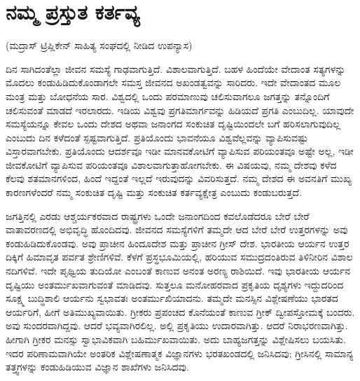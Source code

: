 
\chapter{ನಮ್ಮ ಪ್ರಸ್ತುತ ಕರ್ತವ್ಯ}

\begin{center}
(ಮದ್ರಾಸ್​ ಟ್ರಿಪ್ಲಿಕೇನ್​ ಸಾಹಿತ್ಯ ಸಂಘದಲ್ಲಿ ನೀಡಿದ ಉಪನ್ಯಾಸ)
\end{center}

ದಿನ ಸಾಗಿದಂತೆಲ್ಲಾ ಜೀವನ ಸಮಸ್ಯೆ ಗಾಢವಾಗುತ್ತಿದೆ. ವಿಶಾಲವಾಗುತ್ತಿದೆ. ಬಹಳ ಹಿಂದೆಯೇ ವೇದಾಂತ ಸತ್ಯಗಳನ್ನು ಮೊದಲು ಕಂಡುಹಿಡಿದುಕೊಂಡಾಗಲೇ ಸಮಸ್ತ ಜೀವನದ ಅಖಂಡತ್ವವನ್ನು ಸಾರಿದರು. ಇದೇ ವೇದಾಂತದ ಮೂಲ ಮಂತ್ರ ಮತ್ತು ಬೋಧನೆಯ ಸಾರ. ವಿಶ್ವದಲ್ಲಿ ಒಂದು ಪರಮಾಣುವು ಚಲಿಸುವಾಗಲೂ ಜಗತ್ತನ್ನು ತನ್ನೊಂದಿಗೆ ಚಲಿಸುವಂತೆ ಮಾಡದೆ ಇರಲಾರದು. ಇಡಿಯ ವಿಶ್ವವು ಪ್ರಗತಿಮಾರ್ಗವನ್ನು ಹಿಡಿಯದೆ ಪ್ರಗತಿ ಎಂಬುದಿಲ್ಲ. ಯಾವುದೇ ಸಮಸ್ಯೆಯನ್ನೂ ಕೇವಲ ಒಂದು ದೇಶದ ಅಥವಾ ಜನಾಂಗದ ಸಂಕುಚಿತ ದೃಷ್ಟಿಯಿಂದಲೇ ಬಗೆ ಹರಿಸಲಾಗುವುದಿಲ್ಲ ಎಂಬುದು ದಿನ ಕಳೆದಂತೆ ಸ್ಪಷ್ಟವಾಗುತ್ತಿದೆ. ಪ್ರತಿಯೊಂದು ಭಾವನೆಯೂ ವಿಶ್ವವೆಲ್ಲವನ್ನು ವ್ಯಾಪಿಸುವಷ್ಟು ವಿಸ್ತಾರವಾಗಬೇಕು. ಪ್ರತಿಯೊಂದು ಆದರ್ಶವೂ ಇಡೀ ಮಾನವಕೋಟಿಗೆ ವ್ಯಾಪಿಸುವ ಪರಿಯಂತವೂ ಅಷ್ಟೇ ಅಲ್ಲ, ಇಡೀ ಜೀವಕೋಟಿಗೆ ವ್ಯಾಪಿಸುವ ಪರಿಯಂತವೂ ವಿಶಾಲವಾಗುತ್ತಾಹೋಗಬೇಕು. ಈ ವಿಷಯವು, ನಮ್ಮ ದೇಶವು ಕಳೆದ ಕೆಲವು ಶತಮಾನಗಳಿಂದ, ಹಿಂದೆ ಇದ್ದಂತೆ ಇಲ್ಲದೆ ಇರುವುದನ್ನು ವಿವರಿಸುತ್ತದೆ. ನಮ್ಮ ದೇಶದ ಈ ಅವನತಿಗೆ ಮುಖ್ಯ ಕಾರಣಗಳೆಂದರೆ ನಮ್ಮ ಸಂಕುಚಿತ ದೃಷ್ಟಿ ಮತ್ತು ಸಂಕುಚಿತ ಕರ್ತವ್ಯಕ್ಷೇತ್ರ ಎಂಬುದು ಕಂಡುಬರುತ್ತದೆ.

ಜಗತ್ತಿನಲ್ಲಿ ಎರಡು ಆಶ್ಚರ್ಯಕರವಾದ ರಾಷ್ಟ್ರಗಳು ಒಂದೇ ಜನಾಂಗದಿಂದ ಕವಲೊಡೆದರೂ ಬೇರೆ ಬೇರೆ ವಾತಾವರಣದಲ್ಲಿ ಅಭಿವೃದ್ಧಿ ಹೊಂದಿದವು. ಜೀವನದ ಸಮಸ್ಯೆಗಳಿಗೆ ತಮ್ಮದೇ ಆದ ಬೇರೆ ಬೇರೆ ಉತ್ತರಗಳನ್ನು ಅವು ಕಂಡುಹಿಡಿದುಕೊಂಡವು. ಅವು ಪ್ರಾಚೀನ ಹಿಂದೂದೇಶ ಮತ್ತು ಪ್ರಾಚೀನ ಗ್ರೀಸ್​ ದೇಶ. ಭಾರತೀಯ ಆರ್ಯನ ಉತ್ತರ ದಿಕ್ಕಿಗೆ ಹಿಮಾವೃತ ಪರ್ವತ ಶ್ರೇಣಿಗಳಿವೆ. ಕೆಳಗೆ ಪ್ರಸ್ಥಭೂಮಿಯಲ್ಲಿ, ಹರಿಯುವ ಸಮುದ್ರದಂತಿರುವ ತಿಳಿನೀರಿನ ವಿಶಾಲ ನದಿಗಳಿವೆ. ಇದೇ ಪೃಥ್ವಿಯ ತುದಿಯೋ ಎಂಬಂತೆ ಕಾಣುವ ಅನಂತ ಅರಣ್ಯ ರಾಶಿಯಿದೆ. ಇವು ಭಾರತೀಯ ಆರ್ಯನ ದೃಷ್ಟಿಯು ಅಂತರ್ಮುಖವಾಗುವಂತೆ ಮಾಡಿದವು. ಸುತ್ತಲೂ ಮನೋಹರವಾದ ಪ್ರಕೃತಿಯ ದೃಶ್ಯಗಳು ಇದ್ದುದರಿಂದ ಸೂಕ್ಷ್ಮ ಬುದ್ಧಿಶಾಲಿ ಆರ್ಯನು ಸ್ವಭಾವತಃ ಅಂತರ್ಮುಖಿಯಾದನು. ತಮ್ಮದೇ ಮನಸ್ಸಿನ ವಿಶ್ಲೇಷಣೆಯು ಭಾರತದ ಆರ್ಯರಿಗೆ, ಹೀಗೆ ಅತಿಮುಖ್ಯವಾಯಿತು. ಗ್ರೀಕರು ಪ್ರಪಂಚದ ಕೊನೆಯಂತೆ ಕಾಣುವ ಗ್ರೀಕ್​ ದ್ವೀಪಸ್ತೋಮಕ್ಕೆ ಬಂದರು. ಅವು ಸುಂದರವಾಗಿದ್ದವು. ಆದರೆ ಭವ್ಯವಾಗಿರಲಿಲ್ಲ. ಅಲ್ಲಿ ಪ್ರಕೃತಿಯು ಉದಾರವಾಗಿತ್ತು. ಆದರೆ ನಿರಾಭರಣವಾಗಿತ್ತು. ಹೀಗಾಗಿ ಗ್ರೀಕರ ಮನಸ್ಸು ಸ್ವಾಭಾವಿಕವಾಗಿ ಬಹಿರ್ಮುಖವಾಯಿತು. ಅದು ಬಾಹ್ಯಜಗತ್ತನ್ನು ವಿಶ್ಲೇಷಿಸಲು ಬಯಸಿತು. ಇದರ ಪರಿಣಾಮವಾಗಿಯೇ ಅಂತರಿಕ ವಿಶ್ಲೇಷಣಾತ್ಮಕ ವಿಜ್ಞಾನಗಳು  ಭರತಖಂಡದಲ್ಲಿ ಜನಿಸಿದವು; ಗ್ರೀಸಿನಲ್ಲಿ ಸಾಮಾನ್ಯ ತತ್ತ್ವಗಳನ್ನು ಕಂಡುಹಿಡಿಯುವ ವಿಜ್ಞಾನ ಶಾಖೆಗಳು  ಜನಿಸಿದವು.

\vskip   4pt

